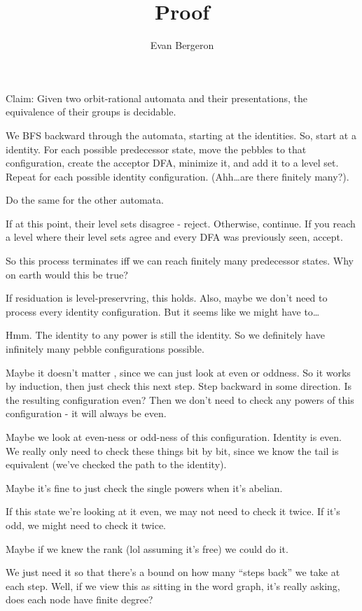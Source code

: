 \documentclass{article}
\title{Proof}
\author{Evan Bergeron}
\begin{document}
\maketitle
Claim: Given two orbit-rational automata and their presentations, the equivalence of their groups is decidable.

We BFS backward through the automata, starting at the identities. So, start at a identity. For each possible predecessor state, move the pebbles to that configuration, create the acceptor DFA, minimize it, and add it to a level set. Repeat for each possible identity configuration. (Ahh\dots are there finitely many?).

Do the same for the other automata.

If at this point, their level sets disagree - reject. Otherwise, continue. 
If you reach a level where their level sets agree and every DFA was previously seen, accept.

So this process terminates iff we can reach finitely many predecessor states. Why on earth would this be true?  

If residuation is level-preservring, this holds. Also, maybe we don't need to process every identity configuration. But it seems like we might have to\dots

Hmm. The identity to any power is still the identity. So we definitely have infinitely many pebble configurations possible.

Maybe it doesn't matter , since we can just look at even or oddness. So it works by induction, then just check this next step. Step backward in some direction. Is the resulting configuration even? Then we don't need to check any powers of this configuration - it will always be even.

Maybe we look at even-ness or odd-ness of this configuration. Identity is even. We really only need to check these things bit by bit, since we know the tail is equivalent (we've checked the path to the identity).

Maybe it's fine to just check the single powers when it's abelian.   

If this state we're looking at it even, we may not need to check it twice. If it's odd, we might need to check it twice.

Maybe if we knew the rank (lol assuming it's free) we could do it.

We just need it so that there's a bound on how many ``steps back'' we take at each step. Well, if we view this as sitting in the word graph, it's really asking, does each node have finite degree?
\end{document}
